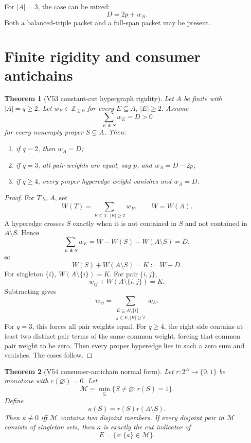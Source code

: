 \documentclass[10.5pt,a4paper]{article}
\newtheorem{theorem}{Theorem}[section]
\newcommand{\cut}{\pitchfork}
\begin{document}
For \(|A|=3\), the case can be mixed:
\[
D=2p+w_A.
\]
Both a balanced-triple packet and a full-span packet may be present.

\section{Finite rigidity and consumer antichains}

\begin{theorem}[V53 constant-cut hypergraph rigidity]
Let \(A\) be finite with \(|A|=q\ge2\). Let \(w_E\in\mathbb Z_{\ge0}\) for every \(E\subseteq A\), \(|E|\ge2\). Assume
\[
\sum_{E\cut S}w_E=D>0
\]
for every nonempty proper \(S\subsetneq A\). Then:
\begin{enumerate}
\item if \(q=2\), then \(w_A=D\);
\item if \(q=3\), all pair weights are equal, say \(p\), and \(w_A=D-2p\);
\item if \(q\ge4\), every proper hyperedge weight vanishes and \(w_A=D\).
\end{enumerate}
\end{theorem}

\begin{proof}
For \(T\subseteq A\), set
\[
W(T)=\sum_{E\subseteq T,\ |E|\ge2}w_E,
\qquad W=W(A).
\]
A hyperedge crosses \(S\) exactly when it is not contained in \(S\) and not contained in \(A\setminus S\). Hence
\[
\sum_{E\cut S}w_E=W-W(S)-W(A\setminus S)=D,
\]
so
\[
W(S)+W(A\setminus S)=K:=W-D.
\]
For singleton \(\{i\}\), \(W(A\setminus\{i\})=K\). For pair \(\{i,j\}\),
\[
w_{ij}+W(A\setminus\{i,j\})=K.
\]
Subtracting gives
\[
w_{ij}=\sum_{\substack{E\subseteq A\setminus\{i\}\\ j\in E,
 |E|\ge2}}w_E.
\]
For \(q=3\), this forces all pair weights equal. For \(q\ge4\), the right side contains at least two distinct pair terms of the same common weight, forcing that common pair weight to be zero. Then every proper hyperedge lies in such a zero sum and vanishes. The cases follow.
\end{proof}

\begin{theorem}[V54 consumer-antichain normal form]
Let \(r:2^A\to\{0,1\}\) be monotone with \(r(\varnothing)=0\). Let
\[
\mathcal M=\min_\subseteq\{S\ne\varnothing:r(S)=1\}.
\]
Define
\[
\kappa(S)=r(S)r(A\setminus S).
\]
Then \(\kappa\not\equiv0\) iff \(\mathcal M\) contains two disjoint members. If every disjoint pair in \(\mathcal M\) consists of singleton sets, then \(\kappa\) is exactly the cut indicator of
\[
E=\{a:\{a\}\in\mathcal M\}.
\]
\end{theorem}
\end{document}
